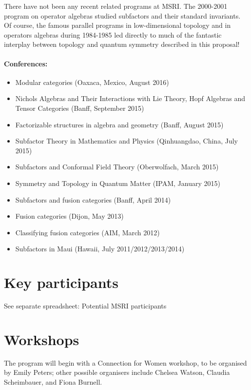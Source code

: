 \documentclass[11pt]{article}
\begin{document}
There have not been any recent related programs at MSRI. The 2000-2001 program on operator algebras studied subfactors and their standard invariants. Of course, the famous parallel programs in low-dimensional topology and in operators algebras during 1984-1985 led directly to much of the fantastic interplay between topology and quantum symmetry described in this proposal!

\paragraph{Conferences:}
\begin{itemize}
  \setlength{\itemsep}{1pt}
  \setlength{\parskip}{0pt}
  \setlength{\parsep}{0pt}
\item Modular categories (Oaxaca, Mexico, August 2016)
\item Nichols Algebras and Their Interactions with Lie Theory, Hopf Algebras and Tensor Categories (Banff, September 2015)
\item Factorizable structures in algebra and geometry (Banff, August 2015)
\item Subfactor Theory in Mathematics and Physics (Qinhuangdao, China, July 2015)
\item Subfactors and Conformal Field Theory (Oberwolfach, March 2015)
\item Symmetry and Topology in Quantum Matter (IPAM, January 2015)
\item Subfactors and fusion categories (Banff, April 2014)
\item Fusion categories (Dijon, May 2013)
\item Classifying fusion categories (AIM, March 2012)
\item Subfactors in Maui (Hawaii, July 2011/2012/2013/2014)
\end{itemize}

\section{Key participants}
See separate spreadsheet: Potential MSRI participants

\section{Workshops}
The program will begin with a Connection for Women workshop, to be organised by Emily Peters; other possible organisers include Chelsea Watson, Claudia Scheimbauer, and Fiona Burnell. 
\end{document}

